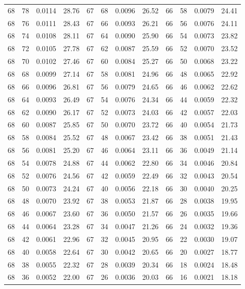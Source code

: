 \begin{tabular}{llll|llll|llll}
68 & 78 & 0.0114 & 28.76 & 67 & 68 & 0.0096 & 26.52 & 66 & 58 & 0.0079 & 24.41\\
68 & 76 & 0.0111 & 28.43 & 67 & 66 & 0.0093 & 26.21 & 66 & 56 & 0.0076 & 24.11\\
68 & 74 & 0.0108 & 28.11 & 67 & 64 & 0.0090 & 25.90 & 66 & 54 & 0.0073 & 23.82\\
68 & 72 & 0.0105 & 27.78 & 67 & 62 & 0.0087 & 25.59 & 66 & 52 & 0.0070 & 23.52\\
68 & 70 & 0.0102 & 27.46 & 67 & 60 & 0.0084 & 25.27 & 66 & 50 & 0.0068 & 23.22\\
68 & 68 & 0.0099 & 27.14 & 67 & 58 & 0.0081 & 24.96 & 66 & 48 & 0.0065 & 22.92\\
68 & 66 & 0.0096 & 26.81 & 67 & 56 & 0.0079 & 24.65 & 66 & 46 & 0.0062 & 22.62\\
68 & 64 & 0.0093 & 26.49 & 67 & 54 & 0.0076 & 24.34 & 66 & 44 & 0.0059 & 22.32\\
68 & 62 & 0.0090 & 26.17 & 67 & 52 & 0.0073 & 24.03 & 66 & 42 & 0.0057 & 22.03\\
68 & 60 & 0.0087 & 25.85 & 67 & 50 & 0.0070 & 23.72 & 66 & 40 & 0.0054 & 21.73\\
68 & 58 & 0.0084 & 25.52 & 67 & 48 & 0.0067 & 23.42 & 66 & 38 & 0.0051 & 21.43\\
68 & 56 & 0.0081 & 25.20 & 67 & 46 & 0.0064 & 23.11 & 66 & 36 & 0.0049 & 21.14\\
68 & 54 & 0.0078 & 24.88 & 67 & 44 & 0.0062 & 22.80 & 66 & 34 & 0.0046 & 20.84\\
68 & 52 & 0.0076 & 24.56 & 67 & 42 & 0.0059 & 22.49 & 66 & 32 & 0.0043 & 20.54\\
68 & 50 & 0.0073 & 24.24 & 67 & 40 & 0.0056 & 22.18 & 66 & 30 & 0.0040 & 20.25\\
68 & 48 & 0.0070 & 23.92 & 67 & 38 & 0.0053 & 21.87 & 66 & 28 & 0.0038 & 19.95\\
68 & 46 & 0.0067 & 23.60 & 67 & 36 & 0.0050 & 21.57 & 66 & 26 & 0.0035 & 19.66\\
68 & 44 & 0.0064 & 23.28 & 67 & 34 & 0.0047 & 21.26 & 66 & 24 & 0.0032 & 19.36\\
68 & 42 & 0.0061 & 22.96 & 67 & 32 & 0.0045 & 20.95 & 66 & 22 & 0.0030 & 19.07\\
68 & 40 & 0.0058 & 22.64 & 67 & 30 & 0.0042 & 20.65 & 66 & 20 & 0.0027 & 18.77\\
68 & 38 & 0.0055 & 22.32 & 67 & 28 & 0.0039 & 20.34 & 66 & 18 & 0.0024 & 18.48\\
68 & 36 & 0.0052 & 22.00 & 67 & 26 & 0.0036 & 20.03 & 66 & 16 & 0.0021 & 18.18\\

\end{tabular}
